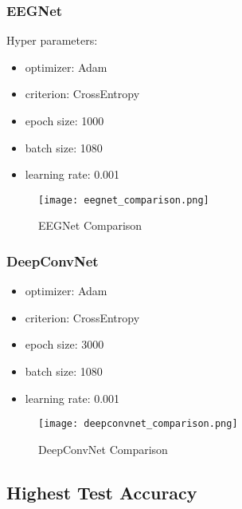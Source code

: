 \subsubsection{EEGNet}
Hyper parameters:
\begin{itemize}
    \item optimizer: Adam
    \item criterion: CrossEntropy
    \item epoch size: 1000
    \item batch size: 1080
    \item learning rate: 0.001
\end{itemize}
\begin{figure}[!ht]
    \begin{center} 
        \texttt{[image: eegnet\_comparison.png]} 
        \caption{EEGNet Comparison}
    \end{center} 
\end{figure}
\subsubsection{DeepConvNet}
\begin{itemize}
    \item optimizer: Adam
    \item criterion: CrossEntropy
    \item epoch size: 3000
    \item batch size: 1080
    \item learning rate: 0.001
\end{itemize}
\begin{figure}[!ht]
    \begin{center} 
        \texttt{[image: deepconvnet\_comparison.png]} 
        \caption{DeepConvNet Comparison}
    \end{center} 
\end{figure}
\subsection{Highest Test Accuracy}
